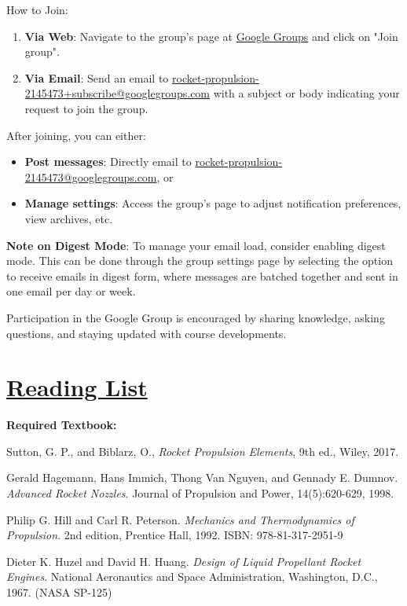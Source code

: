 \documentclass[12pt]{article}
\begin{document}
How to Join:
\begin{enumerate}
    \item \textbf{Via Web}: Navigate to the group's page at \href{https://groups.google.com/g/rocket-propulsion-2145473}{Google Groups} and click on "Join group".
    \item \textbf{Via Email}: Send an email to \href{mailto:rocket-propulsion-2145473+subscribe@googlegroups.com}{rocket-propulsion-2145473+subscribe@googlegroups.com} with a subject or body indicating your request to join the group. 
\end{enumerate}

After joining, you can either:
\begin{itemize}
    \item \textbf{Post messages}: Directly email to \href{mailto:rocket-propulsion-2145473@googlegroups.com}{rocket-propulsion-2145473@googlegroups.com}, or 
    \item \textbf{Manage settings}: Access the group's page to adjust notification preferences, view archives, etc.
\end{itemize}

\textbf{Note on Digest Mode}: To manage your email load, consider enabling digest mode. This can be done through the group settings page by selecting the option to receive emails in digest form, where messages are batched together and sent in one email per day or week.

Participation in the Google Group is encouraged by sharing knowledge, asking questions, and staying updated with course developments.

\section{\hyperref[sec:reading]{Reading List}}
\label{sec:reading}
\textbf{Required Textbook:}\\
\vspace{1pt}

Sutton, G. P., and Biblarz, O., \textit{Rocket Propulsion Elements}, 9th ed., Wiley, 2017.

\begin{thebibliography}{9}
Gerald Hagemann, Hans Immich, Thong Van Nguyen, and Gennady E. Dumnov. \textit{Advanced Rocket Nozzles}. Journal of Propulsion and Power, 14(5):620-629, 1998.

Philip G. Hill and Carl R. Peterson. \textit{Mechanics and Thermodynamics of Propulsion}. 2nd edition, Prentice Hall, 1992. ISBN: 978-81-317-2951-9

Dieter K. Huzel and David H. Huang. \textit{Design of Liquid Propellant Rocket Engines}. National Aeronautics and Space Administration, Washington, D.C., 1967. (NASA SP-125)
\end{thebibliography}

\label{LastPage}
\end{document}

